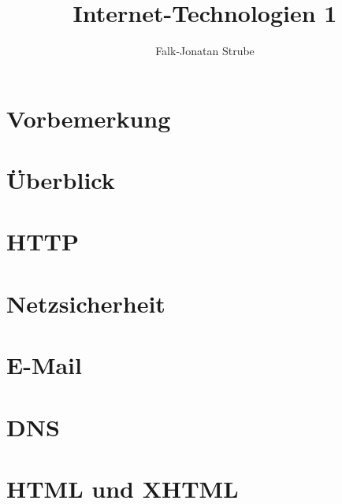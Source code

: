 \documentclass{scrreprt}
\title{Internet-Technologien 1}
\author{Falk-Jonatan Strube}
\begin{document}
\maketitle
\tableofcontents

\chapter*{Vorbemerkung}

\chapter{Überblick}


\chapter{HTTP}


\chapter{Netzsicherheit}




\chapter{E-Mail}


\chapter{DNS}


\chapter{HTML und XHTML}


\end{document}
